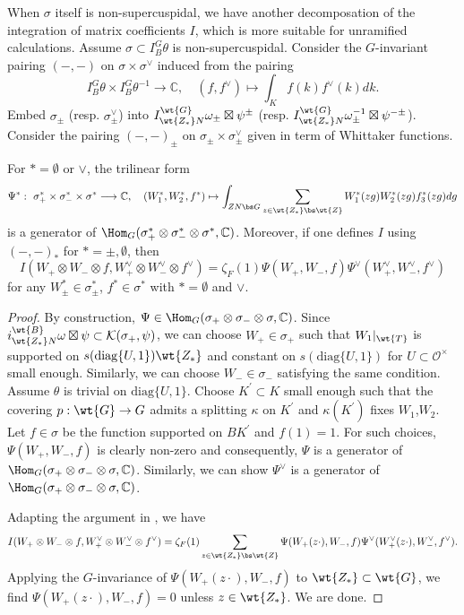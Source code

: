 \documentclass[11pt,reqno]{amsart}
\newcommand{\BC}{{\mathbb {C}}} \newcommand{\BD}{{\mathbb {D}}}
\newcommand{\CK}{{\mathcal {K}}} \newcommand{\CL}{{\mathcal {L}}}
\newcommand{\CO}{{\mathcal {O}}} \newcommand{\CP}{{\mathcal {P}}}
\newcommand{\diag}{{\mathrm{diag}}}
\newcommand{\lra}{\longrightarrow}\newcommand{\lla}{\longleftarrow}
\theoremstyle{plain}
\theoremstyle{remark} \newtheorem{remark}[thm]{Remark}
\theoremstyle{definition} \newtheorem{exercise}[thm]{Exercise}
\theoremstyle{definition} \newtheorem{example}[thm]{Example} \newtheorem{condition}[thm]{Condition}
\numberwithin{equation}{section}
\renewcommand{\-}{\text{--}}
\begin{document}
When $\sigma$ itself is non-supercuspidal, we have another decomposation of the integration of matrix coefficients $I$, which is more suitable for unramified calculations. Assume $\sigma\subset I_B^G\theta$ is non-supercuspidal.  Consider the $G$-invariant pairing $(-,-)$ on $\sigma\times\sigma^\vee$ induced from the pairing \[I_B^G\theta\times I_B^G\theta^{-1}\lra\BC,\quad (f,f^\vee)\mapsto\int_{K}f(k)f^\vee(k)dk.\]
Embed $\sigma_\pm$ (resp. $\sigma_\pm^\vee$) into $I_{\wt{Z_*}N}^{\wt{G}}\omega_{\pm}\boxtimes\psi^{\pm}$ (resp. $I_{\wt{Z_*}N}^{\wt{G}}\omega_{\pm}^{-1}\boxtimes\psi^{-\pm}$).
Consider the pairing $(-,-)_\pm$ on $\sigma_{\pm}\times\sigma_{\pm}^\vee$ given in term of Whittaker functions.
\begin{prop}\label{Tri-II}
For $*=\emptyset$ or $\vee$, the trilinear form 
\[\Psi^*:\ \sigma_+^*\times\sigma_-^*\times\sigma^*\lra\BC,\quad (W_1^*,W_2^*,f^*)\mapsto\int_{ZN\bs G}\sum_{z\in \wt{Z_*}\bs\wt{Z}}W_1^*(zg)W_2^*(zg)f_3^*(zg)dg\]
is a generator of $\Hom_{G}(\sigma_+^*\otimes\sigma_-^*\otimes\sigma^*,\BC)$. Moreover, if one defines $I$ using $(-,-)_*$ for $*=\pm,\emptyset$, then 
\[I(W_+\otimes W_-\otimes f, W_+^\vee\otimes W_-^\vee\otimes f^\vee)=\zeta_F(1)\Psi(W_+,W_-,f)\Psi^\vee(W_+^\vee,W_-^\vee,f^\vee)\]
for any $W_\pm^* \in \sigma_\pm^*$, $f^* \in \sigma^*$ with $* = \emptyset$ and $\vee$.
\end{prop}
\begin{proof} By construction,  $\Psi\in \Hom_G(\sigma_+\otimes\sigma_-\otimes\sigma,\BC)$. Since $i_{\wt{Z_*}N}^{\wt{B}}\omega\boxtimes\psi\subset \CK(\sigma_+,\psi)$, we can choose $W_+\in \sigma_+$ such that $W_1|_{\wt{T}}$ is supported on $s(\diag\{U,1\})\wt{Z_*}$ and constant on $s(\diag\{U,1\})$ for $U\subset\CO^\times$ small enough. Similarly, we can choose $W_-\in\sigma_-$ satisfying the same condition. Assume $\theta$ is trivial on $\diag\{U,1\}$. Choose $K^\prime\subset K$ small enough  such that the covering $p: \wt{G}\to G$ admits a splitting $\kappa$ on $K^\prime$ and $\kappa(K^\prime)$ fixes $W_1$,$W_2$. Let $f\in\sigma$ be the function supported on $BK^\prime$ and $f(1)=1$. For such choices, $\Psi(W_+,W_-,f)$ is clearly non-zero and consequently, $\Psi$ is a generator of $\Hom_G(\sigma_+\otimes\sigma_-\otimes\sigma,\BC)$. Similarly, we can show $\Psi^\vee$ is a generator of $\Hom_G(\sigma_+\otimes\sigma_-\otimes\sigma,\BC)$.

Adapting the argument in \cite[Proposition 5.2]{Hsi21}, we have 
\[I(W_+\otimes W_-\otimes f, W_+^\vee\otimes W_-^\vee\otimes f^\vee)=\zeta_F(1)\sum_{z\in \wt{Z_*}\bs\wt{Z}}\Psi(W_+(z\cdot),W_-,f)\Psi^\vee(W_+^\vee(z\cdot),W_-^\vee,f^\vee).\]
Applying the $G$-invariance of $\Psi(W_+(z\cdot),W_-,f)$ to $\wt{Z_*}\subset \wt{G}$, we find $\Psi(W_+(z\cdot),W_-,f)=0$ unless $z\in \wt{Z_*}$. We are done.
\end{proof}
\end{document}
